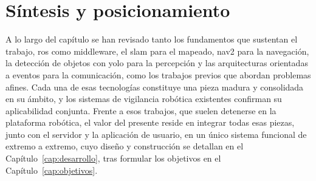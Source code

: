 \section{Síntesis y posicionamiento}
\label{sec:sintesis}

A lo largo del capítulo se han revisado tanto los fundamentos que sustentan el
trabajo, \gls{ros} como middleware, el \gls{slam} para el mapeado, \gls{nav2}
para la navegación, la detección de objetos con \gls{yolo} para la percepción y
las arquitecturas orientadas a eventos para la comunicación, como los trabajos
previos que abordan problemas afines. Cada una de esas tecnologías constituye una
pieza madura y consolidada en su ámbito, y los sistemas de vigilancia robótica
existentes confirman su aplicabilidad conjunta. Frente a esos trabajos, que
suelen detenerse en la plataforma robótica, el valor del presente reside en
integrar todas esas piezas, junto con el servidor y la aplicación de usuario, en
un único sistema funcional de extremo a extremo, cuyo diseño y construcción se
detallan en el Capítulo~\ref{cap:desarrollo}, tras formular los objetivos en el
Capítulo~\ref{cap:objetivos}.
